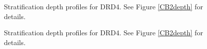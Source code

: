\documentclass{article}
\begin{document}
\clearpage

\begin{figure}
  \centering
  \caption{Stratification depth profiles for DRD4. See Figure
    \ref{CB2depth} for details.}
\end{figure}

\clearpage

\begin{figure}
  \centering
  \caption{Stratification depth profiles for DRD4. See Figure
    \ref{CB2depth} for details.}
\end{figure}
\end{document}
